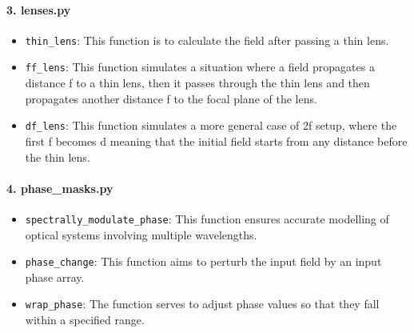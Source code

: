 \documentclass[a4paper,12pt]{report}
\begin{document}
\paragraph*{3. \textbf{lenses.py}}
\begin{itemize}
  \item \texttt{thin\_lens}: This function is to calculate the field after passing a thin lens.
  \item \texttt{ff\_lens}: This function simulates a situation where a field propagates a distance f to a thin lens, then it passes through the thin lens and then propagates another distance f to the focal plane of the lens.
  \item \texttt{df\_lens}: This function simulates a more general case of 2f setup, where the first f becomes d meaning that the initial field starts from any distance before the thin lens.
\end{itemize}

\paragraph*{4. \textbf{phase\_masks.py}}
\begin{itemize}
  \item \texttt{spectrally\_modulate\_phase}: This function ensures accurate modelling of optical systems involving multiple wavelengths.
  \item \texttt{phase\_change}: This function aims to perturb the input field by an input phase array.
  \item \texttt{wrap\_phase}: The function serves to adjust phase values so that they fall within a specified range.
\end{itemize}

\end{document}

